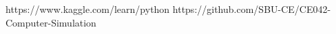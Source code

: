 \documentclass{article}
\begin{document}
\begin{thebibliography}{99} %


\begin{LTRitems}

\resetlatinfont

 https://www.kaggle.com/learn/python
 https://github.com/SBU-CE/CE042-Computer-Simulation

\end{LTRitems}

\end{thebibliography}
\end{document}
